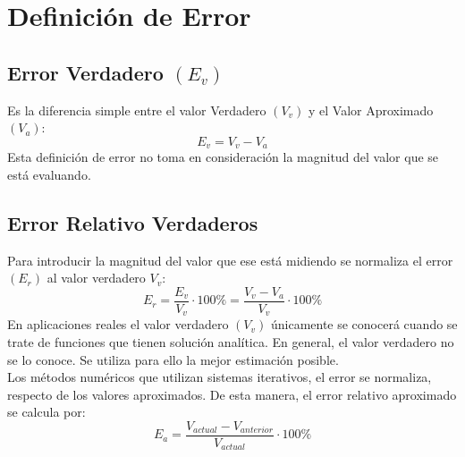 \section{Definición de Error}
\subsection{Error Verdadero $(E_v)$}
Es la diferencia simple entre el valor Verdadero $(V_v)$ y el Valor Aproximado $(V_a)$:
$$E_v=V_v - V_a$$
Esta definición de error no toma en consideración la magnitud del valor que se está evaluando.
\subsection{Error Relativo Verdaderos}
Para introducir la magnitud del valor que ese está midiendo se normaliza el error $(E_r)$ al valor verdadero $V_v$:
$$E_r = \dfrac{E_v}{V_v}\cdot 100\% = \dfrac{V_v-V_a}{V_v}\cdot 100\% $$
En aplicaciones reales el valor verdadero $(V_v)$ únicamente se conocerá cuando se trate de funciones que tienen solución analítica. En general, el valor verdadero no se lo conoce. Se utiliza para ello la mejor estimación posible.
\\${ }$\\
Los métodos numéricos que utilizan sistemas iterativos, el error se normaliza, respecto de los valores aproximados. De esta manera, el error relativo aproximado se calcula por:
$$E_a = \dfrac{V_{actual}-V_{anterior}}{V_{actual}}\cdot 100\% $$